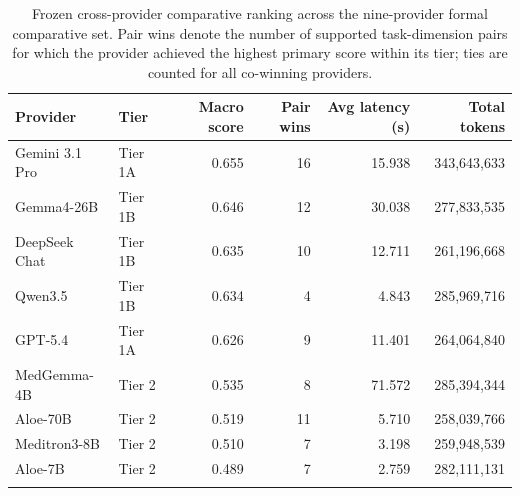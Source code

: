 \begin{table}[t]
\caption{Frozen cross-provider comparative ranking across the nine-provider formal comparative set. Pair wins denote the number of supported task-dimension pairs for which the provider achieved the highest primary score within its tier; ties are counted for all co-winning providers.}
\label{tab:provider_ranking}
\centering
\scriptsize
\begin{tabular}{@{}llrrrr@{}}
\toprule
Provider & Tier & Macro score & Pair wins & Avg latency (s) & Total tokens \\
\midrule
Gemini 3.1 Pro & Tier 1A & 0.655 & 16 & 15.938 & 343,643,633 \\
Gemma4-26B & Tier 1B & 0.646 & 12 & 30.038 & 277,833,535 \\
DeepSeek Chat & Tier 1B & 0.635 & 10 & 12.711 & 261,196,668 \\
Qwen3.5 & Tier 1B & 0.634 & 4 & 4.843 & 285,969,716 \\
GPT-5.4 & Tier 1A & 0.626 & 9 & 11.401 & 264,064,840 \\
MedGemma-4B & Tier 2 & 0.535 & 8 & 71.572 & 285,394,344 \\
Aloe-70B & Tier 2 & 0.519 & 11 & 5.710 & 258,039,766 \\
Meditron3-8B & Tier 2 & 0.510 & 7 & 3.198 & 259,948,539 \\
Aloe-7B & Tier 2 & 0.489 & 7 & 2.759 & 282,111,131 \\
\botrule
\end{tabular}
\normalsize
\end{table}
